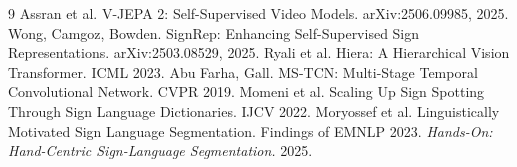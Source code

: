 \documentclass[10pt,twocolumn]{article}
\begin{document}
{\small

\begin{thebibliography}{9}
 Assran et al. V-JEPA 2: Self-Supervised Video Models. arXiv:2506.09985, 2025.
 Wong, Camgoz, Bowden. SignRep: Enhancing Self-Supervised Sign Representations. arXiv:2503.08529, 2025.
 Ryali et al. Hiera: A Hierarchical Vision Transformer. ICML 2023.
 Abu Farha, Gall. MS-TCN: Multi-Stage Temporal Convolutional Network. CVPR 2019.
 Momeni et al. Scaling Up Sign Spotting Through Sign Language Dictionaries. IJCV 2022.
 Moryossef et al. Linguistically Motivated Sign Language Segmentation. Findings of EMNLP 2023.
 \emph{Hands-On: Hand-Centric Sign-Language Segmentation.} 2025.
\end{thebibliography}
}
\end{document}
